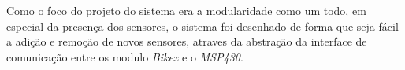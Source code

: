 Como o foco do projeto do sistema era a modularidade como um todo, em especial da presença dos sensores, o sistema foi desenhado de forma que seja fácil a adição e remoção de novos sensores, atraves da abstração da interface de comunicação entre os modulo \textit{Bikex} e o \textit{MSP430}.

